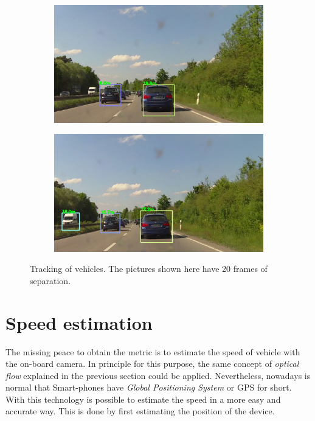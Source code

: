 \begin{figure}[t]
\begin{subfigure}[b]{0.4\textwidth}
\centering
\includegraphics[width=0.9\linewidth]{img/tracking3.jpg}
\end{subfigure}
\begin{subfigure}[b]{0.4\textwidth}
\centering
\includegraphics[width=0.9\linewidth]{img/tracking4.jpg}
\end{subfigure}
\caption{Tracking of vehicles. The pictures shown here have 20 frames of
separation.}
\label{fig:tracking}
\end{figure}


\section{Speed estimation} %
\label{sec:speed-estimation}

The missing peace to obtain the metric is to estimate the speed of vehicle with
the on-board camera. In principle for this purpose, the same concept of
\textit{optical flow} explained in the previous section could be applied.
Nevertheless, nowadays is normal that Smart-phones have \textit{Global
Positioning System} or GPS for short. With this technology is possible to
estimate the speed in a more easy and accurate way. This is done by first
estimating the position of the device.

